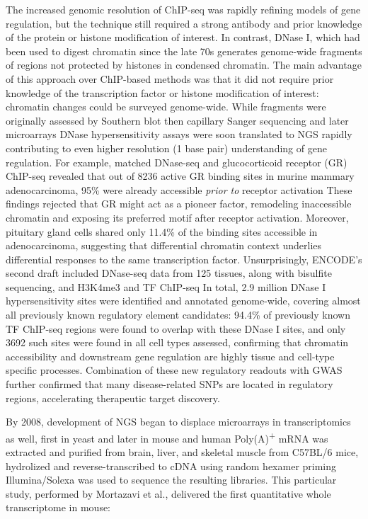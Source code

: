 The increased genomic resolution of ChIP-seq was rapidly refining models of gene regulation, but the technique still required a strong antibody and prior knowledge of the protein or histone modification of interest. In contrast, DNase I, which had been used to digest chromatin since the late 70s generates genome-wide fragments of regions not protected by histones in condensed chromatin. The main advantage of this approach over ChIP-based methods was that it did not require prior knowledge of the transcription factor or histone modification of interest: chromatin changes could be surveyed genome-wide. While fragments were originally assessed by Southern blot then capillary Sanger sequencing and later microarrays DNase hypersensitivity assays were soon translated to NGS rapidly contributing to even higher resolution (1 base pair) understanding of gene regulation. For example, matched DNase-seq and glucocorticoid receptor (GR) ChIP-seq revealed that out of \num{8236} active GR binding sites in murine mammary adenocarcinoma, 95\% were already accessible \textit{prior to} receptor activation These findings rejected that GR might act as a pioneer factor, remodeling inaccessible chromatin and exposing its preferred motif after receptor activation. Moreover, pituitary gland cells shared only 11.4\% of the binding sites accessible in adenocarcinoma, suggesting that differential chromatin context underlies differential responses to the same transcription factor. Unsurprisingly, ENCODE's second draft included DNase-seq data from 125 tissues, along with bisulfite sequencing, and H3K4me3 and TF ChIP-seq In total, 2.9 million DNase I hypersensitivity sites were identified and annotated genome-wide, covering almost all previously known regulatory element candidates: 94.4\% of previously known TF ChIP-seq regions were found to overlap with these DNase I sites, and only \num{3692} such sites were found in all cell types assessed, confirming that chromatin accessibility and downstream gene regulation are highly tissue and cell-type specific processes. Combination of these new regulatory readouts with GWAS further confirmed that many disease-related SNPs are located in regulatory regions, accelerating therapeutic target discovery.

By 2008, development of NGS began to displace microarrays in transcriptomics as well, first in yeast and later in mouse and human Poly(A)\textsuperscript{+} mRNA was extracted and purified from brain, liver, and skeletal muscle from C57BL/6 mice, hydrolized and reverse-transcribed to cDNA using random hexamer priming Illumina/Solexa was used to sequence the resulting libraries. This particular study, performed by Mortazavi et al., delivered the first quantitative whole transcriptome in mouse:

